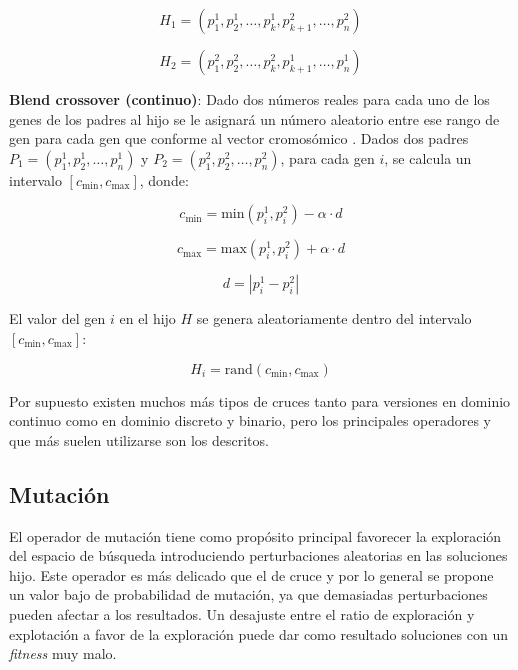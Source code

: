 \documentclass[12pt,letterpaper]{article}
\begin{document}
\begin{equation}
H_1 = (p_1^1, p_2^1, \dots, p_k^1, p_{k+1}^2, \dots, p_n^2)
\label{eq:one_point_h1}
\end{equation}

\begin{equation}
H_2 = (p_1^2, p_2^2, \dots, p_k^2, p_{k+1}^1, \dots, p_n^1)
\label{eq:one_point_h2}
\end{equation}

\textbf{Blend crossover (continuo)}: Dado dos números reales para cada uno de los genes de
los padres al hijo se le asignará un número aleatorio entre ese rango de gen
para cada gen que conforme al vector cromosómico \cite{purduelecture}.
Dados dos padres \( P_1 = (p_1^1, p_2^1, \dots, p_n^1) \) y \( P_2 = (p_1^2, p_2^2, \dots, p_n^2) \), para cada gen \( i \), se calcula un intervalo \( [c_{\text{min}}, c_{\text{max}}] \), donde:

\begin{equation}
c_{\text{min}} = \text{min}(p_i^1, p_i^2) - \alpha \cdot d
\label{eq:blx_cmin}
\end{equation}

\begin{equation}
c_{\text{max}} = \text{max}(p_i^1, p_i^2) + \alpha \cdot d
\label{eq:blx_cmax}
\end{equation}

\begin{equation}
d = |p_i^1 - p_i^2|
\label{eq:blx_d}
\end{equation}

El valor del gen \( i \) en el hijo \( H \) se genera aleatoriamente dentro del intervalo \( [c_{\text{min}}, c_{\text{max}}] \):

\begin{equation}
H_i = \text{rand}(c_{\text{min}}, c_{\text{max}})
\label{eq:blx_hi}
\end{equation}

Por supuesto existen muchos más tipos de cruces tanto para versiones en dominio continuo como en dominio discreto y binario, pero los principales operadores y que más suelen utilizarse son los descritos.

\subsection{Mutación}
El operador de mutación tiene como propósito principal favorecer la exploración del espacio de búsqueda introduciendo perturbaciones aleatorias en las soluciones hijo. Este operador es más delicado que el de cruce y por lo general se propone un valor bajo de probabilidad de mutación, ya que demasiadas perturbaciones pueden afectar a los resultados. Un desajuste entre el ratio de exploración y explotación a favor de la exploración puede dar como resultado soluciones con un \textit{fitness} muy malo.
\end{document}

